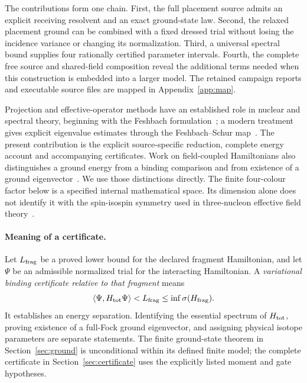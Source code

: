 \documentclass[11pt]{article}
\theoremstyle{definition}
\begin{document}
The contributions form one chain. First, the full placement source admits an explicit receiving resolvent and an exact ground-state law. Second, the relaxed placement ground can be combined with a fixed dressed trial without losing the incidence variance or changing its normalization. Third, a universal spectral bound supplies four rationally certified parameter intervals. Fourth, the complete free source and shared-field composition reveal the additional terms needed when this construction is embedded into a larger model. The retained campaign reports and executable source files are mapped in Appendix~\ref{app:map}.

Projection and effective-operator methods have an established role in nuclear and spectral theory, beginning with the Feshbach formulation~\cite{feshbach}; a modern treatment gives explicit eigenvalue estimates through the Feshbach--Schur map~\cite{dss}. The present contribution is the explicit source-specific reduction, complete energy account and accompanying certificates. Work on field-coupled Hamiltonians also distinguishes a ground energy from a binding comparison and from existence of a ground eigenvector~\cite{gll,lieb_loss}. We use those distinctions directly. The finite four-colour factor below is a specified internal mathematical space. Its dimension alone does not identify it with the spin-isospin symmetry used in three-nucleon effective field theory~\cite{vanasse}.

\paragraph{Meaning of a certificate.}
Let $L_{\rm frag}$ be a proved lower bound for the declared fragment Hamiltonian, and let $\Psi$ be an admissible normalized trial for the interacting Hamiltonian. A \emph{variational binding certificate relative to that fragment} means
\begin{equation}\label{eq:meaning}
 \langle\Psi,H_{\rm tot}\Psi\rangle<L_{\rm frag}
 \leq\inf\sigma(H_{\rm frag}).
\end{equation}
It establishes an energy separation. Identifying the essential spectrum of $H_{\rm tot}$, proving existence of a full-Fock ground eigenvector, and assigning physical isotope parameters are separate statements. The finite ground-state theorem in Section~\ref{sec:ground} is unconditional within its defined finite model; the complete certificate in Section~\ref{sec:certificate} uses the explicitly listed moment and gate hypotheses.
\end{document}
